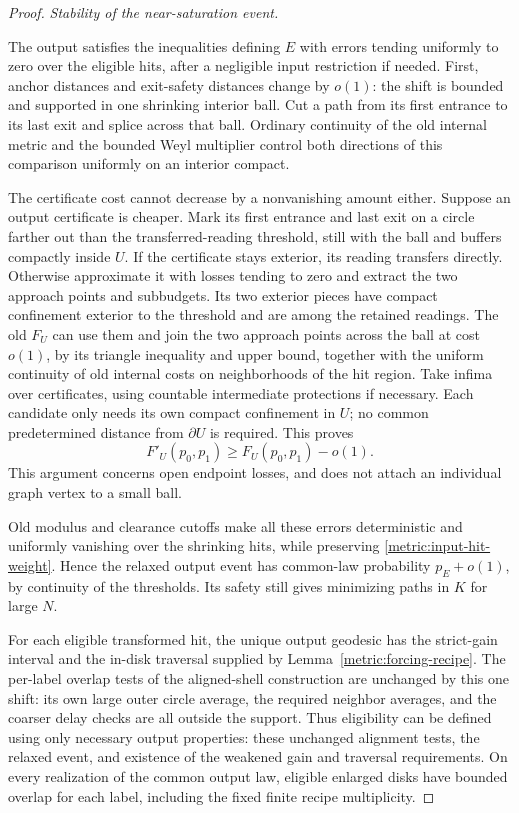\begin{proof}
\smallskip\noindent\emph{Stability of the near-saturation event.}\par
The output satisfies the inequalities defining $E$ with errors tending
uniformly to zero over the eligible hits, after a negligible input
restriction if needed. First, anchor distances and exit-safety distances
change by $o(1)$: the shift is bounded and supported in one shrinking
interior ball. Cut a path from its first entrance to its last exit and
splice across that ball. Ordinary continuity of the old internal metric
and the bounded Weyl multiplier control both directions of this
comparison uniformly on an interior compact.

The certificate cost cannot decrease by a nonvanishing amount either.
Suppose an output certificate is cheaper. Mark its first entrance and
last exit on a circle farther out than the transferred-reading threshold,
still with the ball and buffers compactly inside $U$. If the certificate
stays exterior, its reading transfers directly. Otherwise approximate it
with losses tending to zero and extract the two approach points and
subbudgets. Its two exterior pieces have compact confinement exterior to
the threshold and are among the retained readings. The old $F_U$ can
use them and join the two approach points across the ball at cost $o(1)$,
by its triangle inequality and upper bound, together with the uniform
continuity of old internal costs on neighborhoods of the hit region.
Take infima over certificates, using countable intermediate protections
if necessary. Each candidate only needs its own compact confinement in
$U$; no common predetermined distance from $\partial U$ is required.
This proves
\[
 F'_U(p_0,p_1)\ge F_U(p_0,p_1)-o(1).
\]
This argument concerns open endpoint losses, and does not attach an
individual graph vertex to a small ball.

Old modulus and clearance cutoffs make all these errors deterministic
and uniformly vanishing over the shrinking hits, while preserving
\eqref{metric:input-hit-weight}. Hence the relaxed output event has
common-law probability $p_E+o(1)$, by continuity of the thresholds. Its
safety still gives minimizing paths in $K$ for large $N$.

For each eligible transformed hit, the unique output geodesic has the
strict-gain interval and the in-disk traversal supplied by
Lemma~\ref{metric:forcing-recipe}. The per-label overlap tests of the
aligned-shell construction are unchanged by this one shift: its own
large outer circle average, the required neighbor averages, and the
coarser delay checks are all outside the support. Thus eligibility can
be defined using only necessary output properties: these unchanged
alignment tests, the relaxed event, and existence of the weakened gain
and traversal requirements. On every realization of the common output
law, eligible enlarged disks have bounded overlap for each label,
including the fixed finite recipe multiplicity.


\end{proof}
